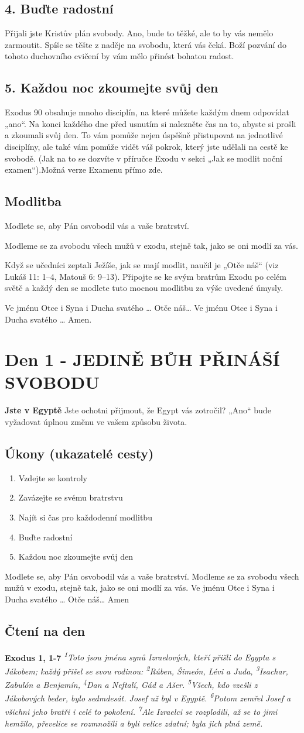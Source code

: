 \documentclass[11pt]{article}
\newcommand{\zacatekPrvniTyden}{
  \textbf{Jste v Egyptě} \newline
  Jste ochotni přijmout, že Egypt vás zotročil? „Ano“ bude vyžadovat úplnou změnu ve vašem způsobu života.

\subsection*{Úkony (ukazatelé cesty)}
\begin{enumerate}
  \item Vzdejte se kontroly
  \item Zavázejte se svému bratrstvu
  \item Najít si čas pro každodenní modlitbu
  \item Buďte radostní
  \item Každou noc zkoumejte svůj den
\end{enumerate}
Modlete se, aby Pán osvobodil vás a vaše bratrství. \newline
Modleme se za svobodu všech mužů v exodu, stejně tak, jako se oni modlí za vás.\newline
Ve jménu Otce i Syna i Ducha svatého …  Otče náš… Amen
}
\begin{document}
\subsection*{4. Buďte radostní}
Přijali jste Kristův plán svobody. Ano, bude to těžké, ale to by vás nemělo zarmoutit. Spíše se těšte z naděje na svobodu, která vás čeká. Boží pozvání do tohoto duchovního cvičení by vám mělo přinést bohatou radost.

\subsection*{5. Každou noc zkoumejte svůj den}
Exodus 90 obsahuje mnoho disciplín, na které můžete každým dnem odpovídat „ano“. Na konci každého dne před usnutím si nalezněte čas na to, abyste si prošli a zkoumali svůj den. To vám pomůže nejen úspěšně přistupovat na jednotlivé disciplíny, ale také vám pomůže vidět váš pokrok, který jste udělali na cestě ke svobodě. (Jak na to se dozvíte v příručce Exodu v sekci „Jak se modlit noční examen“).Možná verze Examenu přímo zde.

\subsection*{Modlitba}
Modlete se, aby Pán osvobodil vás a vaše bratrství.

Modleme se za svobodu všech mužů v exodu, stejně tak, jako se oni modlí za vás.

Když se učedníci zeptali Ježíše, jak se mají modlit, naučil je „Otče náš“ (viz Lukáš 11: 1–4, Matouš 6: 9–13). Připojte se ke svým bratrům Exodu po celém světě a každý den se modlete tuto mocnou modlitbu za výše uvedené úmysly.

Ve jménu Otce i Syna i Ducha svatého …  Otče náš… Ve jménu Otce i Syna i Ducha svatého … Amen.

\newpage
\section{Den 1 - JEDINĚ BŮH PŘINÁŠÍ SVOBODU}
\zacatekPrvniTyden
\subsection*{Čtení na den}
\textbf{Exodus 1, 1-7}
\newline
\textit{
\textsuperscript{1}Toto jsou jména synů Izraelových, kteří přišli do Egypta s Jákobem; každý přišel se svou rodinou:
\textsuperscript{2}Rúben, Šimeón, Lévi a Juda,
\textsuperscript{3}Isachar, Zabulón a Benjamín,
\textsuperscript{4}Dan a Neftalí, Gád a Ašer.
\textsuperscript{5}Všech, kdo vzešli z Jákobových beder, bylo sedmdesát. Josef už byl v Egyptě.
\textsuperscript{6}Potom zemřel Josef a všichni jeho bratři i celé to pokolení.
\textsuperscript{7}Ale Izraelci se rozplodili, až se to jimi hemžilo, převelice se rozmnožili a byli velice zdatní; byla jich plná země.
}
\end{document}
